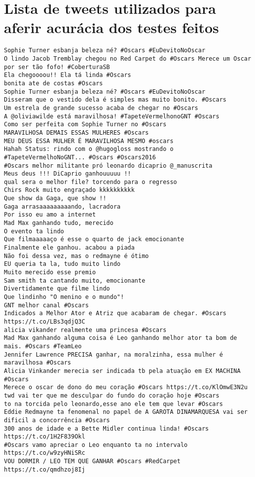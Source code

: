 \chapter{Lista de tweets utilizados para aferir acurácia dos testes feitos}

\begin{lstlisting}[style=text, frame=single]
Sophie Turner esbanja beleza né? #Oscars #EuDevitoNoOscar
O lindo Jacob Tremblay chegou no Red Carpet do #Oscars Merece um Oscar por ser tão fofo! #CoberturaSB
Ela chegoooou!! Ela tá linda #Oscars
bonita ate de costas #Oscars
Sophie Turner esbanja beleza né? #Oscars #EuDevitoNoOscar
Disseram que o vestido dela é simples mas muito bonito. #Oscars
Um estrela de grande sucesso acaba de chegar no #Oscars
A @oliviawilde está maravilhosa! #TapeteVermelhonoGNT #Oscars
Como ser perfeita com Sophie Turner no #Oscars
MARAVILHOSA DEMAIS ESSAS MULHERES #Oscars
MEU DEUS ESSA MULHER É MARAVILHOSA MESMO #oscars
Hahah Status: rindo com o @hugogloss mostrando o #TapeteVermelhoNoGNT... #Oscars #Oscars2016
#Oscars melhor militante pró leonardo dicaprio @_manuscrita
Meus deus !!! DiCaprio ganhouuuuu !!
qual sera o melhor file? torcendo para o regresso
Chirs Rock muito engraçado kkkkkkkkkk
Que show da Gaga, que show !!
Gaga arrasaaaaaaaaando, lacradora
Por isso eu amo a internet
Mad Max ganhando tudo, merecido
O evento ta lindo
Que filmaaaaaço é esse o quarto de jack emocionante
Finalmente ele ganhou. acabou a piada
Não foi dessa vez, mas o redmayne é ótimo
EU queria ta la, tudo muito lindo
Muito merecido esse premio
Sam smith ta cantando muito, emocionante
Divertidamente que filme lindo
Que lindinho "O menino e o mundo"! 
GNT melhor canal #Oscars
Indicados a Melhor Ator e Atriz que acabaram de chegar. #Oscars https://t.co/LBs3qdjQ3C
alicia vikander realmente uma princesa #Oscars
Mad Max ganhando alguma coisa é Leo ganhando melhor ator ta bom de mais. #Oscars #TeamLeo
Jennifer Lawrence PRECISA ganhar, na moralzinha, essa mulher é maravilhosa #Oscars
Alicia Vinkander merecia ser indicada tb pela atuação em EX MACHINA #Oscars
Merece o oscar de dono do meu coração #Oscars https://t.co/KlOmwE3N2u
twd vai ter que me desculpar do fundo do coração hoje #Oscars
to na torcida pelo leonardo,esse ano ele tem que levar #Oscars
Eddie Redmayne ta fenomenal no papel de A GAROTA DINAMARQUESA vai ser dificil a concorrência #Oscars
300 anos de idade e a Bette Midler continua linda! #Oscars https://t.co/1H2F839Okl
#Oscars vamo apreciar o Leo enquanto ta no intervalo https://t.co/w9zyHNiSRc
VOU DORMIR / LEO TEM QUE GANHAR #Oscars #RedCarpet https://t.co/qmdhzoj8Ij

\end{lstlisting}
